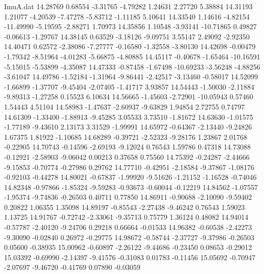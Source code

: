 \begin{filecontents}{ImuA.dat}
  14.28769    0.68554   -3.31765   -4.79282    1.24631    2.27720    5.38884
  14.31193    1.21077   -4.20539   -7.47278   -5.83712   -1.11185    5.10641
  14.33540    1.14616   -4.82154  -11.49990   -5.19595   -2.88271    1.70973
  14.35856    1.10548   -3.93141  -10.71865    0.49827   -0.06613   -1.29767
  14.38145    0.63529   -3.18126   -9.09751    3.55147    2.49092   -2.92350
  14.40471    0.62572   -2.38086   -7.27777   -0.16580   -1.32558   -3.80130
  14.42698   -0.00479   -1.79342   -8.51964   -4.01283   -5.66875   -4.80885
  14.45117   -0.40678   -1.65464  -10.16591   -5.15015   -5.53899   -4.35087
  14.47333   -0.87458   -1.67498  -10.69233   -3.56248   -4.88256   -3.61047
  14.49786   -1.52184   -1.31964   -9.86441   -2.42517   -3.13460   -0.58017
  14.52099   -1.66899   -1.37707   -9.45404   -2.07405   -1.41717    3.93857
  14.54443   -1.50030   -2.11884   -9.89313   -1.27258    0.15523    6.10634
  14.56665   -1.45603   -2.72901  -10.05943    0.57460    1.54443    4.51104
  14.58983   -1.47637   -2.60937   -9.63829    1.94854    2.72755    0.74797
  14.61309   -1.33400   -1.88913   -9.45285    3.05533    3.73510   -1.81672
  14.63630   -1.01575   -1.77189   -9.43610    2.13173    3.31529   -1.99991
  14.65972   -0.64367   -2.13440   -9.24826    1.67375    1.81922   -1.10685
  14.68289   -0.39721   -2.52323   -9.28176    1.23867    2.01768   -0.22905
  14.70743   -0.14596   -2.69193   -9.12024    0.76543    1.59786    0.47318
  14.73088   -0.12921   -2.58903   -9.06042    0.00213    0.37658    0.75560
  14.75392   -0.24287   -2.44666   -9.15853   -0.70774   -0.27986    0.29762
  14.77710   -0.42951   -2.18584   -9.37867   -1.08176   -0.92103   -0.44278
  14.80021   -0.67837   -1.99920   -9.51626   -1.21152   -1.16528   -0.74046
  14.82348   -0.97866   -1.85324   -9.59283   -0.93673   -0.60044   -0.12219
  14.84562   -1.07557   -1.95374   -9.74836   -0.26503    0.40711    0.77850
  14.86911   -0.90688   -2.10090   -9.59402    0.20822    1.06355    1.35098
  14.89197   -0.85543   -2.27438   -9.46242    0.76543    1.59023    1.13725
  14.91767   -0.72742   -2.33061   -9.35713    0.75779    1.36124    0.48082
  14.94014   -0.57787   -2.40120   -9.24706    0.29218    0.66664   -0.01533
  14.96382   -0.60538   -2.42273   -9.30090   -0.02840    0.26972   -0.29775
  14.98672   -0.58744   -2.37727   -9.37986   -0.26503    0.05600   -0.38935
  15.00962   -0.60897   -2.26122   -9.44686   -0.23450    0.08653   -0.29012
  15.03392   -0.69990   -2.14397   -9.41576   -0.31083    0.01783   -0.11456
  15.05692   -0.70947   -2.07697   -9.46720   -0.41769    0.07890   -0.03059

\end{filecontents}

